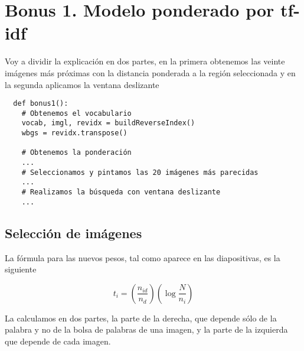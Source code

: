 \documentclass{article}
\begin{document}
\section{Bonus 1. Modelo ponderado por tf-idf}

Voy a dividir la explicación en dos partes, en la primera obtenemos las veinte imágenes más próximas con la distancia ponderada a la región seleccionada y en la segunda aplicamos la ventana deslizante

\begin{verbatim}
  def bonus1():
    # Obtenemos el vocabulario
    vocab, imgl, revidx = buildReverseIndex()
    wbgs = revidx.transpose()

    # Obtenemos la ponderación
    ...
    # Seleccionamos y pintamos las 20 imágenes más parecidas
    ...	
    # Realizamos la búsqueda con ventana deslizante
    ...
\end{verbatim}

\subsection{Selección de imágenes}

La fórmula para las nuevos pesos, tal como aparece en las diapositivas, es la siguiente

\[t_i = (\frac{n_{id}}{n_d})(\log\frac{N}{n_i})\]

La calculamos en dos partes, la parte de la derecha, que depende sólo de la palabra y no de la bolsa de palabras de una imagen, y la parte de la izquierda que depende de cada imagen.

\end{document}

